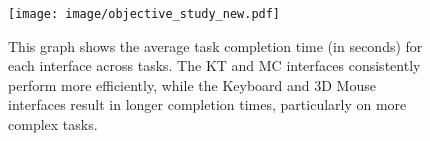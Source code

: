 \begin{figure}[h!]
    \centering
    \texttt{[image: image/objective\_study\_new.pdf]}
    \caption{This graph shows the average task completion time (in seconds) for each interface across tasks. The KT and MC interfaces consistently perform more efficiently, while the Keyboard and 3D Mouse interfaces result in longer completion times, particularly on more complex tasks.}
    \label{fig:objective_study}
\end{figure}